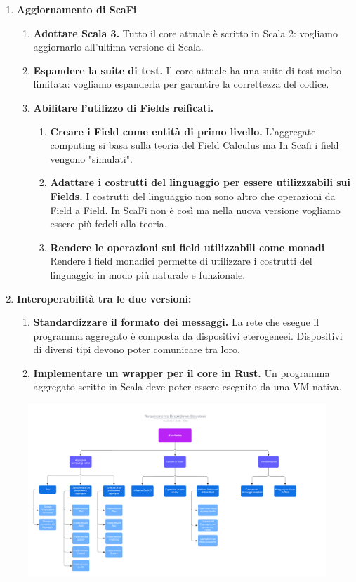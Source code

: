 \documentclass[12pt, a4paper]{article}
\begin{document}
\begin{enumerate}
    \item \textbf{Aggiornamento di ScaFi}
        \begin{enumerate}
            \item \textbf{Adottare Scala 3.} Tutto il core attuale è scritto in Scala 2: vogliamo aggiornarlo 
            all'ultima versione di Scala.
            
            \item \textbf{Espandere la suite di test.} Il core attuale ha una suite di test molto limitata: vogliamo
            espanderla per garantire la correttezza del codice. 
            
            \item \textbf{Abilitare l'utilizzo di Fields reificati.}
                \begin{enumerate}
                    \item \textbf{Creare i Field come entità di primo livello.} L'aggregate computing si basa sulla 
                    teoria del Field Calculus ma In Scafi i field vengono "simulati". 
                    \item \textbf{Adattare i costrutti del linguaggio per essere utilizzzabili sui Fields.} I costrutti 
                    del linguaggio non sono altro che operazioni da Field a Field. In ScaFi non è così ma nella nuova
                    versione vogliamo essere più fedeli alla teoria. 
                    \item \textbf{Rendere le operazioni sui field utilizzabili come monadi} Rendere i field monadici 
                    permette di utilizzare i costrutti del linguaggio in modo più naturale e funzionale.
                \end{enumerate}
        \end{enumerate}

    \item \textbf{Interoperabilità tra le due versioni:}
        \begin{enumerate}
            \item \textbf{Standardizzare il formato dei messaggi.} La rete che esegue il programma aggregato è composta 
            da dispositivi eterogeneei. Dispositivi di diversi tipi devono poter comunicare tra loro.
            \item \textbf{Implementare un wrapper per il core in Rust.} Un programma aggregato scritto in Scala deve 
            poter essere eseguito da una VM nativa.
        \end{enumerate}
\end{enumerate}

\begin{figure}[h]
    \includegraphics[angle=90, width=\textwidth, height=\textheight]{res/rbs.png}
\end{figure}
\end{document}
